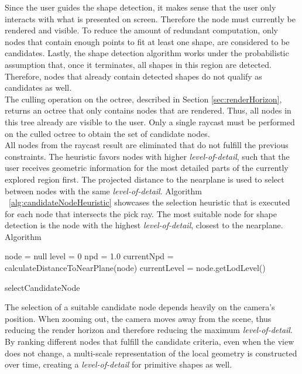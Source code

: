 Since the user guides the shape detection, it makes sense that the user only interacts with what is presented on screen. Therefore the node must currently be rendered and visible. To reduce the amount of redundant computation, only nodes that contain enough points to fit at least one shape, are considered to be candidates. Lastly, the shape detection algorithm works under the probabilistic assumption that, once it terminates, all shapes in this region are detected. Therefore, nodes that already contain detected shapes do not qualify as candidates as well. 
\\
The culling operation on the octree, described in Section \ref{sec:renderHorizon}, returns an octree that only contains nodes that are rendered. Thus, all nodes in this tree already are visible to the user. Only a single raycast must be performed on the culled octree to obtain the set of candidate nodes. 
\\
All nodes from the raycast result are eliminated that do not fulfill the previous constraints. The heuristic favors nodes with higher \textit{level-of-detail}, such that the user receives geometric information for the most detailed parts of the currently explored region first. The projected distance to the nearplane is used to select between nodes with the same \textit{level-of-detail}. Algorithm ~\ref{alg:candidateNodeHeuristic} showcases the selection heuristic that is executed for each node that intersects the pick ray. The most suitable node for shape detection is the node with the highest \textit{level-of-detail}, closest to the nearplane. Algorithm 

\begin{algorithm}
    
    node     = null\;
    level = 0\;
    npd     = 1.0\;
    {            
        currentNpd = calculateDistanceToNearPlane(node)    \;
        currentLevel = node.getLodLevel()\;
    }
\caption{selectCandidateNode}
\label{alg:candidateNodeHeuristic}
\end{algorithm}

The selection of a suitable candidate node depends heavily on the camera's position. When zooming out, the camera moves away from the scene, thus reducing the render horizon and therefore reducing the maximum \textit{level-of-detail}. By ranking different nodes that fulfill the candidate criteria, even when the view does not change, a multi-scale representation of the local geometry is constructed over time, creating a \textit{level-of-detail} for primitive shapes as well. 


